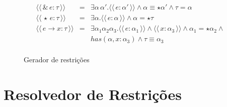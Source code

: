 \documentclass[a4paper,8pt]{article}
\newcommand{\constr}[1]{\ensuremath{\langle\langle\,#1\,\rangle\rangle}}
\begin{document}
\begin{figure}[h]
\[{\begin{array}{lcl}
                     \constr{\&\,e : \tau} & = & \exists \alpha\,
                                                 \alpha'. \constr{e :
                                                 \alpha'} \land
                                                 \alpha \equiv \star \alpha'
                                                 \land \tau = \alpha\\
                     \constr{\star\,e : \tau} & = & \exists
                                                    \alpha. \constr{e
                                                    : \alpha} \land
                                                    \alpha = \star \tau\\
                     \constr{e\to x : \tau} & = & \exists
                                                  \alpha_1\alpha_2\alpha_3. \constr{e
                                                  :\alpha_1} \land
                                                  \constr{x :
                                                  \alpha_3} \land
                                                  \alpha_1 = \star\alpha_2
                                                  \land\\
                          & & has(\alpha,x : \alpha_3) \land \tau
                              \equiv \alpha_3\\
            \end{array}}
       \]
       \centering
       \caption{Gerador de restrições}
       \label{figgen}
     \end{figure}

     \section{Resolvedor de Restrições}\label{constraintsolver}
\end{document}
